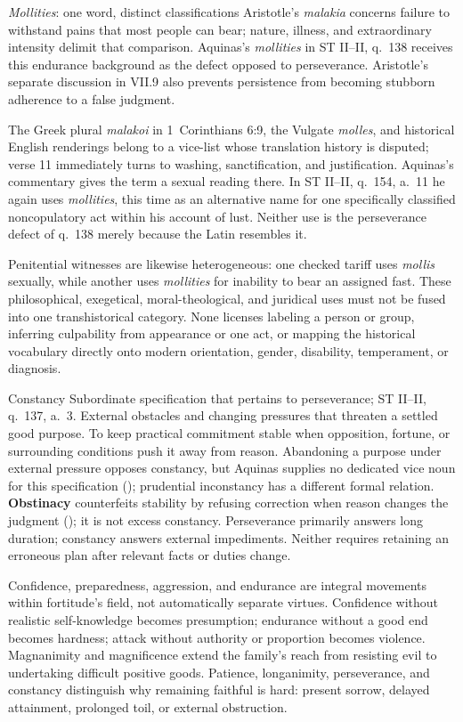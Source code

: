 \begin{studybox}{\emph{Mollities}: one word, distinct classifications}
Aristotle's \emph{malakia} concerns failure to withstand pains that most people
can bear; nature, illness, and extraordinary intensity delimit that comparison.
Aquinas's \emph{mollities} in ST II--II, q.~138 receives this endurance
background as the defect opposed to perseverance. Aristotle's separate
discussion in VII.9 also prevents persistence from becoming stubborn adherence
to a false judgment.

The Greek plural \emph{malakoi} in 1~Corinthians 6:9, the Vulgate
\emph{molles}, and historical English renderings belong to a vice-list whose
translation history is disputed; verse 11 immediately turns to washing,
sanctification, and justification. Aquinas's commentary gives the term a
sexual reading there. In ST II--II, q.~154, a.~11 he again uses
\emph{mollities}, this time as an alternative name for one specifically
classified noncopulatory act within his account of lust. Neither use is the
perseverance defect of q.~138 merely because the Latin resembles it.

Penitential witnesses are likewise heterogeneous: one checked tariff uses
\emph{mollis} sexually, while another uses \emph{mollities} for inability to
bear an assigned fast. These philosophical, exegetical, moral-theological, and
juridical uses must not be fused into one transhistorical category. None
licenses labeling a person or group, inferring culpability from appearance or
one act, or mapping the historical vocabulary directly onto modern orientation,
gender, disability, temperament, or diagnosis.
\end{studybox}

\virtuedossier
  {Constancy}
  {Subordinate specification that pertains to perseverance; ST II--II, q.~137, a.~3.}
  {External obstacles and changing pressures that threaten a settled good purpose.}
  {To keep practical commitment stable when opposition, fortune, or surrounding conditions push it away from reason.}
  {Abandoning a purpose under external pressure opposes constancy, but Aquinas supplies no dedicated vice noun for this specification (); prudential inconstancy has a different formal relation.}
  {\textbf{Obstinacy} counterfeits stability by refusing correction when reason changes the judgment (); it is not excess constancy.}
  {Perseverance primarily answers long duration; constancy answers external impediments. Neither requires retaining an erroneous plan after relevant facts or duties change.}


Confidence, preparedness, aggression, and endurance are integral movements within fortitude's field, not automatically separate virtues. Confidence without realistic self-knowledge becomes presumption; endurance without a good end becomes hardness; attack without authority or proportion becomes violence. Magnanimity and magnificence extend the family's reach from resisting evil to undertaking difficult positive goods. Patience, longanimity, perseverance, and constancy distinguish why remaining faithful is hard: present sorrow, delayed attainment, prolonged toil, or external obstruction.
